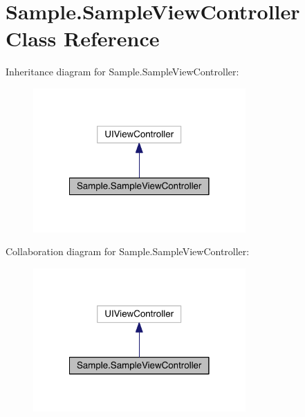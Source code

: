 \hypertarget{class_sample_1_1_sample_view_controller}{\section{Sample.\+Sample\+View\+Controller Class Reference}
\label{class_sample_1_1_sample_view_controller}
}


Inheritance diagram for Sample.\+Sample\+View\+Controller\+:
\nopagebreak
\begin{figure}[H]
\begin{center}
\leavevmode
\includegraphics[width=230pt]{class_sample_1_1_sample_view_controller__inherit__graph}
\end{center}
\end{figure}


Collaboration diagram for Sample.\+Sample\+View\+Controller\+:
\nopagebreak
\begin{figure}[H]
\begin{center}
\leavevmode
\includegraphics[width=230pt]{class_sample_1_1_sample_view_controller__coll__graph}
\end{center}
\end{figure}
